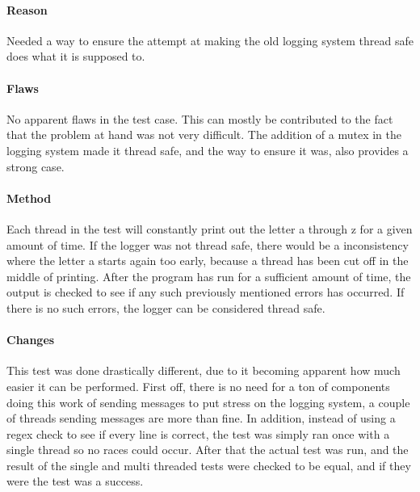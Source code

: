 \paragraph{Reason}
Needed a way to ensure the attempt at making the old logging system thread safe does what it is supposed to.

\paragraph{Flaws}
No apparent flaws in the test case.
This can mostly be contributed to the fact that the problem at hand was not very difficult.
The addition of a mutex in the logging system made it thread safe, and the way to ensure it was, also provides a strong case.

\paragraph{Method}
Each thread in the test will constantly print out the letter a through z for a given amount of time.
If the logger was not thread safe, there would be a inconsistency where the letter a starts again too early, because a thread has been cut off in the middle of printing.
After the program has run for a sufficient amount of time, the output is checked to see if any such previously mentioned errors has occurred.
If there is no such errors, the logger can be considered thread safe.

\paragraph{Changes}
This test was done drastically different, due to it becoming apparent how much easier it can be performed.
First off, there is no need for a ton of components doing this work of sending messages to put stress on the logging system, a couple of threads sending messages are more than fine.
In addition, instead of using a regex check to see if every line is correct, the test was simply ran once with a single thread so no races could occur.
After that the actual test was run, and the result of the single and multi threaded tests were checked to be equal, and if they were the test was a success.

